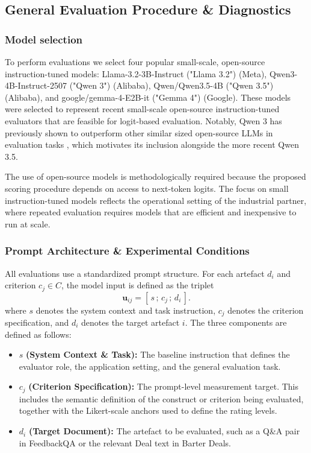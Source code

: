 
\subsection{General Evaluation Procedure \& Diagnostics}

\subsubsection{Model selection}

To perform evaluations we select four popular small-scale, open-source instruction-tuned models: Llama-3.2-3B-Instruct ("Llama 3.2") (Meta), Qwen3-4B-Instruct-2507 ("Qwen 3") \citep{qwen3technicalreport} (Alibaba), Qwen/Qwen3.5-4B ("Qwen 3.5") (Alibaba), and google/gemma-4-E2B-it ("Gemma 4") (Google). These models were selected to represent recent small-scale open-source instruction-tuned evaluators that are feasible for logit-based evaluation. Notably, Qwen 3 has previously shown to outperform other similar sized open-source LLMs in evaluation tasks \citep{gu_survey_2025}, which motivates its inclusion alongside the more recent Qwen 3.5.

The use of open-source models is methodologically required because the proposed scoring procedure depends on access to next-token logits. The focus on small instruction-tuned models reflects the operational setting of the industrial partner, where repeated evaluation requires models that are efficient and inexpensive to run at scale.

\subsubsection{Prompt Architecture \& Experimental Conditions}\label{sec:meth_prompt}

All evaluations use a standardized prompt structure. For each artefact $d_i$ and criterion $c_j \in C$, the model input is defined as the triplet
\[
    \mathbf{u}_{ij} = [\, s \,;\, c_j \,;\, d_i \,].
\]
where $s$ denotes the system context and task instruction, $c_j$ denotes the criterion specification, and $d_i$ denotes the target artefact $i$. The three components are defined as follows:

\begin{itemize} 
    \item $s$ \textbf{(System Context \& Task):} The baseline instruction that defines the evaluator role, the application setting, and the general evaluation task. 
    \item $c_j$ \textbf{(Criterion Specification):} The prompt-level measurement target. This includes the semantic definition of the construct or criterion being evaluated, together with the Likert-scale anchors used to define the rating levels. 
    \item $d_i$ \textbf{(Target Document):} The artefact to be evaluated, such as a Q\&A pair in FeedbackQA or the relevant Deal text in Barter Deals. 
\end{itemize}

